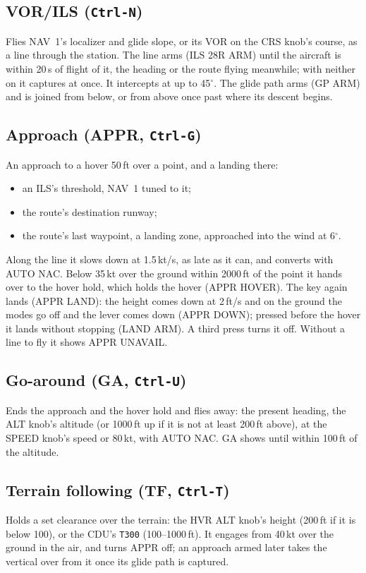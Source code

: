 \documentclass[11pt,a4paper,oneside]{book}
\newcommand{\key}[1]{\texttt{#1}}
\newcommand{\ann}[1]{\textsf{#1}}
\begin{document}
\subsection{VOR/ILS (\key{Ctrl-N})}
Flies NAV~1's localizer and glide slope, or its VOR on the CRS knob's course, as a line through the station. The line
arms (\ann{ILS 28R ARM}) until the aircraft is within 20\,s of flight of it, the heading or the route flying meanwhile;
with neither on it captures at once. It intercepts at up to 45$^\circ$. The glide path arms (\ann{GP ARM}) and is joined
from below, or from above once past where its descent begins.

\subsection{Approach (APPR, \key{Ctrl-G})}\label{sec:appr}
An approach to a hover 50\,ft over a point, and a landing there:
\begin{itemize}
\item an ILS's threshold, NAV~1 tuned to it;
\item the route's destination runway;
\item the route's last waypoint, a landing zone, approached into the wind at 6$^\circ$.
\end{itemize}
Along the line it slows down at 1.5\,kt/s, as late as it can, and converts with AUTO NAC. Below 35\,kt over the ground
within 2000\,ft of the point it hands over to the hover hold, which holds the hover (\ann{APPR HOVER}). The key again
lands (\ann{APPR LAND}): the height comes down at 2\,ft/s and on the ground the modes go off and the lever comes down
(\ann{APPR DOWN}); pressed before the hover it lands without stopping (\ann{LAND ARM}). A third press turns it off.
Without a line to fly it shows \ann{APPR UNAVAIL}.

\subsection{Go-around (GA, \key{Ctrl-U})}
Ends the approach and the hover hold and flies away: the present heading, the ALT knob's altitude (or 1000\,ft up if
it is not at least 200\,ft above), at the SPEED knob's speed or 80\,kt, with AUTO NAC. \ann{GA} shows until within 100\,ft of
the altitude.

\subsection{Terrain following (TF, \key{Ctrl-T})}
Holds a set clearance over the terrain: the HVR ALT knob's height (200\,ft if it is below 100), or the CDU's \key{T300}
(100--1000\,ft). It engages from 40\,kt over the ground in the air, and turns APPR off; an approach armed later takes
the vertical over from it once its glide path is captured.
\end{document}
